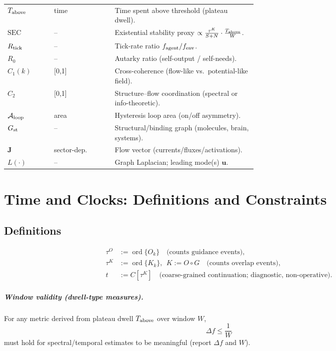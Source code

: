 \documentclass[12pt,a4paper,oneside]{scrreprt}
\begin{document}
\begin{table}[htbp]
\begin{tabular}{llp{0.58\linewidth}}
$T_{\rm above}$ & time & Time spent above threshold (plateau dwell).\\
$\mathrm{SEC}$ & – & Existential stability proxy $\propto \frac{\tau^K}{S+N}\cdot\frac{T_{\rm above}}{W}$.\\
$R_{\rm tick}$ & – & Tick-rate ratio $f_{\rm agent}/f_{\rm env}$.\\
$R_0$ & – & Autarky ratio (self-output / self-needs).\\
$C_1(k)$ & [0,1] & Cross-coherence (flow-like vs.\ potential-like field).\\
$C_2$ & [0,1] & Structure–flow coordination (spectral or info-theoretic).\\
$\mathcal A_{\rm loop}$ & area & Hysteresis loop area (on/off asymmetry).\\
$G_{\rm st}$ & – & Structural/binding graph (molecules, brain, systems).\\
$\mathbf J$ & sector-dep. & Flow vector (currents/fluxes/activations).\\
$L(\cdot)$ & – & Graph Laplacian; leading mode(s) $\mathbf u$.\\
\bottomrule
\end{tabular}
\end{table}

\chapter{Time and Clocks: Definitions and Constraints}\label{app:time}
\section*{Definitions}
\begin{align}
\tau^O &:= \operatorname{ord}\{O_k\}\quad\text{(counts guidance events)},\\
\tau^K &:= \operatorname{ord}\{K_k\},\ \ K:=O\!\circ G\quad\text{(counts overlap events)},\\
t &:= C[\tau^K]\quad\text{(coarse-grained continuation; diagnostic, non-operative).}
\end{align}

\paragraph{Window validity (dwell-type measures).}
For any metric derived from plateau dwell $T_{\rm above}$ over window $W$,
\[
\Delta f \le \frac{1}{W}
\]
must hold for spectral/temporal estimates to be meaningful (report $\Delta f$ and $W$).
\end{document}
